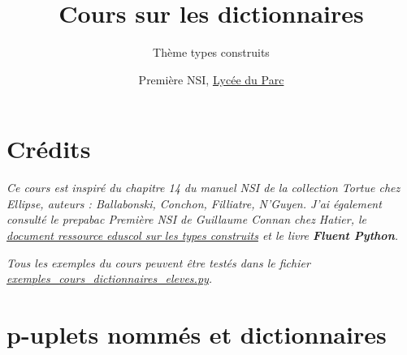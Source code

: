 \documentclass[
  11pt,
]{article}
\title{Cours sur les dictionnaires}
\subtitle{Thème types construits}
\author{Première NSI, \href{https://frederic-junier.org/}{Lycée du
Parc}}
\date{}
\newcounter{cours}
\begin{document}
\maketitle

\renewcommand*\contentsname{Table des matières}
{
\hypersetup{linkcolor=}
\setcounter{tocdepth}{3}
\tableofcontents
}
\hypertarget{cruxe9dits}{%
\section{Crédits}\label{cruxe9dits}}

\emph{Ce cours est inspiré du chapitre 14 du manuel NSI de la collection
Tortue chez Ellipse, auteurs : Ballabonski, Conchon, Filliatre, N'Guyen.
J'ai également consulté le prepabac Première NSI de Guillaume Connan
chez Hatier, le
\href{https://cache.media.eduscol.education.fr/file/NSI/77/7/RA_Lycee_G_NSI_repd_types_construits_1170777.pdf}{document
ressource eduscol sur les types construits} et le livre \textbf{Fluent
Python}.}

\emph{Tous les exemples du cours peuvent être testés dans le fichier
\url{exemples_cours_dictionnaires_eleves.py}.}

\hypertarget{p-uplets-nommuxe9s-et-dictionnaires}{%
\section{p-uplets nommés et
dictionnaires}\label{p-uplets-nommuxe9s-et-dictionnaires}}
\end{document}
